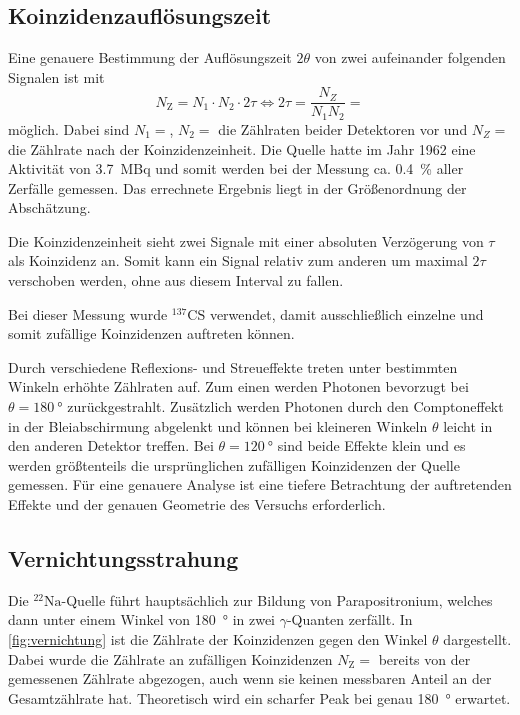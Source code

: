 \subsection{Koinzidenzauflösungszeit}
	
	Eine genauere Bestimmung der Auflösungszeit $2\theta$ von zwei aufeinander folgenden Signalen ist mit
	\begin{equation}
		N_\text{Z} = N_1 \cdot N_2 \cdot 2\tau \Leftrightarrow 2\tau = \frac{N_Z}{N_1 N_2} = 
	\end{equation}
	möglich.
	Dabei sind $N_1 = $, $N_2 = $ die Zählraten beider Detektoren vor und $N_Z = $ die Zählrate nach der Koinzidenzeinheit.
	Die Quelle hatte im Jahr 1962 eine Aktivität von \SI{3.7}{\mega\becquerel} und somit werden bei der Messung ca. \SI{0.4}{\%} aller Zerfälle gemessen.
	Das errechnete Ergebnis liegt in der Größenordnung der Abschätzung.

	Die Koinzidenzeinheit sieht zwei Signale mit einer absoluten Verzögerung von $\tau$ als Koinzidenz an.
	Somit kann ein Signal relativ zum anderen um maximal $2 \tau$ verschoben werden, ohne aus diesem Interval zu fallen.
	
	Bei dieser Messung wurde $^{137}\text{CS}$ verwendet, damit ausschließlich einzelne und somit zufällige Koinzidenzen auftreten können.
	
	Durch verschiedene Reflexions- und Streueffekte treten unter bestimmten Winkeln erhöhte Zählraten auf.
	Zum einen werden Photonen bevorzugt bei $\theta = \SI{180}{\degree}$ zurückgestrahlt.
	Zusätzlich werden Photonen durch den Comptoneffekt in der Bleiabschirmung abgelenkt und können bei kleineren Winkeln $\theta$ leicht in den anderen Detektor treffen.
	Bei $\theta = \SI{120}{\degree}$ sind beide Effekte klein und es werden größtenteils die ursprünglichen zufälligen Koinzidenzen der Quelle gemessen.
	Für eine genauere Analyse ist eine tiefere Betrachtung der auftretenden Effekte und der genauen Geometrie des Versuchs erforderlich.
		
\subsection{Vernichtungsstrahung}

	Die $^{22}\text{Na}$-Quelle führt hauptsächlich zur Bildung von Parapositronium, welches dann unter einem Winkel von \SI{180}{\degree} in zwei $\gamma$-Quanten zerfällt.
	In \cref{fig:vernichtung} ist die Zählrate der Koinzidenzen gegen den Winkel $\theta$ dargestellt.
	Dabei wurde die Zählrate an zufälligen Koinzidenzen $N_\text{Z} = $ bereits von der gemessenen Zählrate abgezogen, auch wenn sie keinen messbaren Anteil an der Gesamtzählrate hat.
	Theoretisch wird ein scharfer Peak bei genau \SI{180}{\degree} erwartet.
	

